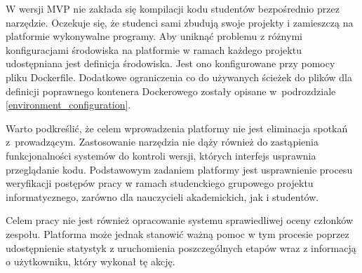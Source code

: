 W wersji MVP nie zakłada się kompilacji kodu studentów bezpośrednio przez narzędzie.
Oczekuje się, że studenci sami zbudują swoje projekty i zamieszczą na platformie wykonywalne programy.
Aby uniknąć problemu z różnymi konfiguracjami środowiska na platformie w ramach każdego projektu udostępniana jest definicja środowiska.
Jest ono konfigurowane przy pomocy pliku Dockerfile.
Dodatkowe ograniczenia co do używanych ścieżek do plików dla definicji poprawnego kontenera Dockerowego zostały opisane w~podrozdziale \ref{environment_configuration}.

Warto podkreślić, że celem wprowadzenia platformy nie jest eliminacja spotkań z~prowadzącym.
Zastosowanie narzędzia nie dąży również do zastąpienia funkcjonalności systemów do kontroli wersji, których interfejs usprawnia przeglądanie kodu.
Podstawowym zadaniem platformy jest usprawnienie procesu weryfikacji postępów pracy w ramach studenckiego grupowego projektu informatycznego, zarówno dla nauczycieli akademickich, jak i studentów.

Celem pracy nie jest również opracowanie systemu sprawiedliwej oceny członków zespołu.
Platforma może jednak stanowić ważną pomoc w tym procesie poprzez udostępnienie statystyk z uruchomienia poszczególnych etapów wraz z informacją o użytkowniku, który wykonał tę akcję.



